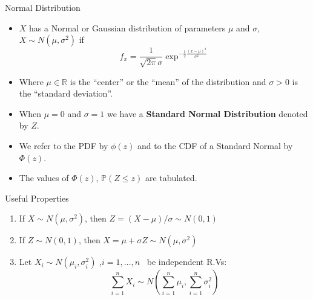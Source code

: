 \documentclass[handout]{beamer}
\begin{document}
\begin{frame}{Normal Distribution}

\scriptsize{
\begin{itemize}
 \item $X$ has a Normal or Gaussian distribution of parameters $\mu$ and $\sigma$, $X \sim N(\mu,\sigma^2)$ if
 \begin{displaymath}
 f_x=\frac{1}{\sqrt{2\pi}\sigma}\exp^{-\frac{1}{2}\frac{(x-\mu)^2}{\sigma^{2}}} 
 \end{displaymath}
 \item Where $\mu \in \mathbb{R}$ is the ``center'' or the ``mean'' of the distribution and $\sigma > 0$ is the ``standard deviation''.
 \item When $\mu = 0$ and $\sigma =1$ we have a \textbf{Standard Normal Distribution} denoted by $Z$.
 \item We refer to the PDF by $\phi(z)$ and to the CDF of a Standard Normal by $\Phi(z)$.
 \item The values of $\Phi(z)$, $\mathbb{P}(Z \leq z)$ are tabulated.
 \end{itemize}

\begin{block}{Useful Properties}
\begin{enumerate}
 \item If $X \sim N(\mu, \sigma^2)$, then $Z=(X-\mu)/\sigma \sim N(0,1)$
 \item If $Z \sim N(0,1)$, then $X=\mu+\sigma Z \sim N(\mu, \sigma^2)$
 \item Let $X_{i} \sim N(\mu_{i},\sigma_{i}^{2})$ ,$i=1,\dots,n$ \  be independent R.Vs:
 \begin{displaymath}
  \sum_{i=1}^{n}X_{i}\sim N( \sum_{i=1}^{n}\mu_{i}, \sum_{i=1}^{n}\sigma_{i}^{2})
 \end{displaymath}

 
\end{enumerate}
 
\end{block}




}
\end{frame}
\end{document}
